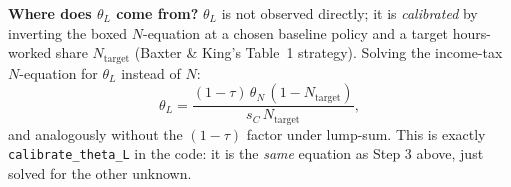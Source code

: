 \documentclass[11pt]{article}
\newcommand{\eq}[1]{\begin{equation}#1\end{equation}}
\begin{document}
\begin{notebox}
\textbf{Where does $\theta_L$ come from?} $\theta_L$ is not observed
directly; it is \emph{calibrated} by inverting the boxed $N$-equation at a
chosen baseline policy and a target hours-worked share $N_{\text{target}}$
(Baxter \& King's Table~1 strategy). Solving the income-tax $N$-equation
for $\theta_L$ instead of $N$:
\eq{ \theta_L = \frac{(1-\tau)\,\theta_N\,(1-N_{\text{target}})}{s_C\,N_{\text{target}}}, }
and analogously without the $(1-\tau)$ factor under lump-sum. This is
exactly \texttt{calibrate\_theta\_L} in the code: it is the \emph{same}
equation as Step 3 above, just solved for the other unknown.
\end{notebox}
\end{document}
